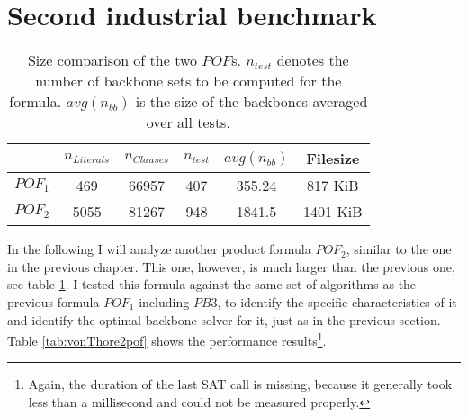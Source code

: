 \section{Second industrial benchmark}

\begin{table} %
\centering
\begin{tabular}{l| c c c c c}
& $n_{Literals}$ & $n_{Clauses}$ & $n_{test}$ & $avg(n_{bb})$ &  Filesize \\
\hline
$POF_1$ & 469 & 66957 & 407 & 355.24 & 817 KiB \\
$POF_2$ & 5055 & 81267 & 948 & 1841.5 & 1401 KiB \\
\end{tabular}
\caption[Size comparison of the two $POF$ formulae. ]{Size comparison of the two $POF$s. 
$n_{test}$ denotes the number of backbone sets to be computed for the formula. $avg(n_{bb})$ is the size of the backbones averaged over all tests.
}
\label{tab:indusComp}
\end{table}

In the following I will analyze another product formula $POF_2$, similar to the one in the previous chapter. This one, however, is much larger than the previous one, see table \ref{tab:indusComp}. I tested this formula against the same set of algorithms as the previous formula $POF_1$ including $PB3$, to identify the specific characteristics of it and identify the optimal backbone solver for it, just as in the previous section. Table \ref{tab:vonThore2pof} shows the performance results\footnote{Again, the duration of the last SAT call is missing, because it generally took less than a millisecond and could not be measured properly.}.


